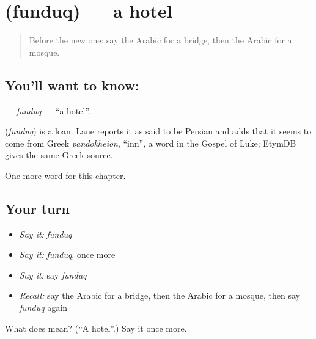 \section[\texorpdfstring{\ar{فندق} (funduq)}{فندق (funduq)}]{ (funduq) — a hotel}

\label{lesson:AR-C92-funduq}



\begin{quote}
Before the new one: say the Arabic for a bridge, then the Arabic for a mosque.
\end{quote}

\subsection*{You'll want to know: }
\textbf{} — \emph{funduq} — \textquotedblleft{}a hotel\textquotedblright{}.

\begin{cousinweb}
\textbf{} (\emph{funduq}) is a loan. Lane reports it as said to be Persian and adds that it seems to come from Greek \emph{pandokheion}, \textquotedblleft{}inn\textquotedblright{}, a word in the Gospel of Luke; EtymDB gives the same Greek source.
\end{cousinweb}

\begin{grammarlens}[title={What you've built}]
One more word for this chapter.
\end{grammarlens}

\subsection*{Your turn}
\begin{itemize}
\raggedright
  \item \emph{Say it:} \emph{funduq}
  \item \emph{Say it:} \emph{funduq}, once more
  \item \emph{Say it:} say \emph{funduq}
  \item \emph{Recall:} say the Arabic for a bridge, then the Arabic for a mosque, then say \emph{funduq} again
\end{itemize}

\begin{tcolorbox}[breakable,colback=teal!4,colframe=teal!35!black,title={Before you move on}]
What does  mean? (\textquotedblleft{}A hotel\textquotedblright{}.) Say it once more.
\end{tcolorbox}

